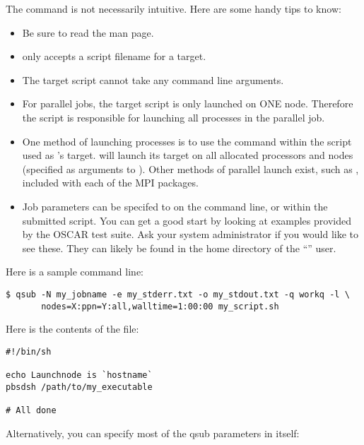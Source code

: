 The  command is not necessarily intuitive.  Here are some
handy tips to know:

\begin{itemize}
\item Be sure to read the  man page.

\item {} only accepts a script filename for a target.
  
\item The target script cannot take any command line arguments.
  
\item For parallel jobs, the target script is only launched on ONE
  node.  Therefore the script is responsible for launching all
  processes in the parallel job.
  
\item One method of launching processes is to use the 
  command within the script used as 's target.
    will launch its target on all allocated processors and nodes
  (specified as arguments to ).  Other methods of parallel
  launch exist, such as , included with each of the MPI packages.
  
\item Job parameters can be specifed to  on the command
  line, or within the submitted script.  You can get a good start by
  looking at examples provided by the OSCAR test suite.  Ask your
  system administrator if you would like to see these.  They can
  likely be found in the home directory of the ``''
  user.
\end{itemize}

Here is a sample  command line:

\begin{verbatim}
$ qsub -N my_jobname -e my_stderr.txt -o my_stdout.txt -q workq -l \
       nodes=X:ppn=Y:all,walltime=1:00:00 my_script.sh
\end{verbatim}

Here is the contents of the  file:

\begin{verbatim}
#!/bin/sh

echo Launchnode is `hostname`
pbsdsh /path/to/my_executable

# All done
\end{verbatim}

Alternatively, you can specify most of the qsub parameters in
 itself:

